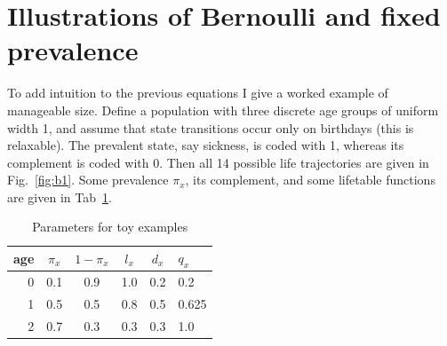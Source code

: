 \documentclass{bmcart}
\begin{document}
\section{Illustrations of Bernoulli and fixed prevalence}
To add intuition to the previous equations I give a worked example of manageable size. Define a population with three discrete age groups of uniform width 1, and assume that state transitions occur only on birthdays (this is relaxable). The prevalent state, say sickness, is coded with 1, whereas its complement is coded with 0. Then all 14 possible life trajectories are given in Fig.~\ref{fig:b1}. Some prevalence $\pi_x$, its complement, and some lifetable functions are given in Tab~\ref{tab:toy}.

\begin{table}[ht!]
\begin{tabular}{r|ccccl}
age & $\pi_x$ & $1-\pi_x$ & $l_x$ & $d_x$ & $q_x$\\
\hline
0 & 0.1 & 0.9 & 1.0 & 0.2 & 0.2   \\
1 & 0.5 & 0.5 & 0.8 & 0.5 & 0.625 \\
2 & 0.7 & 0.3 & 0.3 & 0.3 & 1.0  
\end{tabular}
\caption{Parameters for toy examples}
\label{tab:toy}
\end{table}
\end{document}
